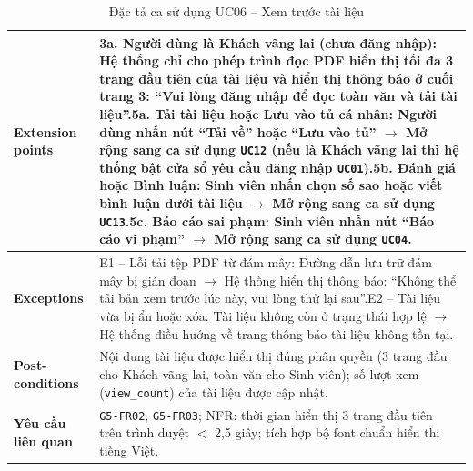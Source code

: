 \begin{table}[H]
\begin{tabularx}{\textwidth}{|p{3.5cm}|X|}
\hline
\textbf{Extension points} & 3a. Người dùng là Khách vãng lai (chưa đăng nhập): Hệ thống chỉ cho phép trình đọc PDF hiển thị tối đa 3 trang đầu tiên của tài liệu và hiển thị thông báo ở cuối trang 3: ``Vui lòng đăng nhập để đọc toàn văn và tải tài liệu''.\newline 5a. Tải tài liệu hoặc Lưu vào tủ cá nhân: Người dùng nhấn nút ``Tải về'' hoặc ``Lưu vào tủ'' $\rightarrow$ Mở rộng sang ca sử dụng \texttt{UC12} (nếu là Khách vãng lai thì hệ thống bật cửa sổ yêu cầu đăng nhập \texttt{UC01}).\newline 5b. Đánh giá hoặc Bình luận: Sinh viên nhấn chọn số sao hoặc viết bình luận dưới tài liệu $\rightarrow$ Mở rộng sang ca sử dụng \texttt{UC13}.\newline 5c. Báo cáo sai phạm: Sinh viên nhấn nút ``Báo cáo vi phạm'' $\rightarrow$ Mở rộng sang ca sử dụng \texttt{UC04}. \\
\hline
\textbf{Exceptions} & E1 -- Lỗi tải tệp PDF từ đám mây: Đường dẫn lưu trữ đám mây bị gián đoạn $\rightarrow$ Hệ thống hiển thị thông báo: ``Không thể tải bản xem trước lúc này, vui lòng thử lại sau''.\newline E2 -- Tài liệu vừa bị ẩn hoặc xóa: Tài liệu không còn ở trạng thái hợp lệ $\rightarrow$ Hệ thống điều hướng về trang thông báo tài liệu không tồn tại. \\
\hline
\textbf{Post-conditions} & Nội dung tài liệu được hiển thị đúng phân quyền (3 trang đầu cho Khách vãng lai, toàn văn cho Sinh viên); số lượt xem (\texttt{view\_count}) của tài liệu được cập nhật. \\
\hline
\textbf{Yêu cầu liên quan} & \texttt{G5-FR02}, \texttt{G5-FR03}; NFR: thời gian hiển thị 3 trang đầu tiên trên trình duyệt $<$ 2,5 giây; tích hợp bộ font chuẩn hiển thị tiếng Việt. \\
\hline
\end{tabularx}
\caption{Đặc tả ca sử dụng UC06 -- Xem trước tài liệu}
\label{tab:uc06}
\end{table}


